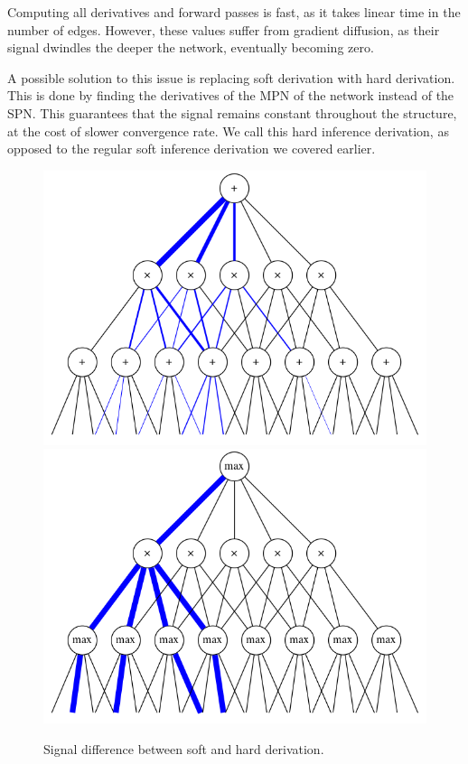 Computing all derivatives and forward passes is fast, as it takes linear time in the number of
edges. However, these values suffer from gradient diffusion, as their signal dwindles the deeper
the network, eventually becoming zero.

A possible solution to this issue is replacing soft derivation with hard derivation. This is done
by finding the derivatives of the MPN of the network instead of the SPN\@. This guarantees that the
signal remains constant throughout the structure, at the cost of slower convergence rate. We call
this hard inference derivation, as opposed to the regular soft inference derivation we covered
earlier.

\begin{figure}[h]
  \centering\includegraphics[scale=0.325]{graphs/softgrad.png}
  \includegraphics[scale=0.325]{graphs/hardgrad.png}
  \caption{Signal difference between soft and hard derivation.\label{fig:soft_hard_diff}}
\end{figure}

